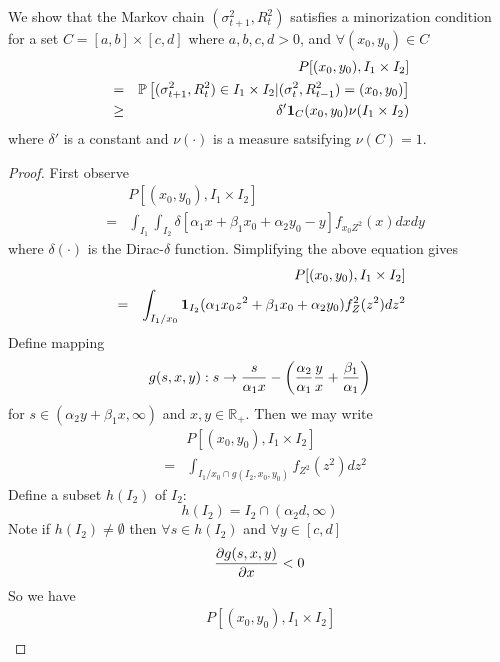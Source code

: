 \documentclass{article}
\theoremstyle{remark}
\begin{document}
We show that the Markov chain $(\sigma_{t+1}^2, R_t^2)$ satisfies a
minorization condition for a set $C = [a, b] \times [c, d]$ where
$a,b,c,d > 0$, and $\forall (x_0, y_0) \in C$
\begin{eqnarray}
  && P[(x_0, y_0), I_1 \times I_2] \nonumber \\
  &=& \mathbb{P} \left[
      (\sigma_{t+1}^2, R_t^2) \in I_1 \times I_2 |
      (\sigma_{t}^2, R_{t-1}^2) = (x_0, y_0)
      \right] \nonumber \\
  &\geq& \delta' \mathbf{1}_{C}(x_0, y_0) \nu(I_1 \times I_2) \label{eq:Minor}
\end{eqnarray}
where $\delta'$ is a constant and $\nu(\cdot)$ is a measure satsifying
$\nu(C) = 1$.
\begin{proof}
  First observe
  \begin{eqnarray*}
    && P[(x_0, y_0), I_1 \times I_2] \\
    &=& \int_{I_1} \int_{I_2}
        \delta \left[
        \alpha_1 x + \beta_1 x_0 + \alpha_2 y_0 - y
        \right]
        f_{x_0 Z^2}(x) dx dy
  \end{eqnarray*}
  where $\delta(\cdot)$ is the Dirac-$\delta$ function.
  Simplifying the above equation gives
  \begin{eqnarray*}
    && P[(x_0, y_0), I_1 \times I_2] \\
    &=& \int_{I_1/x_0} \mathbf{1}_{I_2}(\alpha_1 x_0 z^2 + \beta_1 x_0 +
        \alpha_2 y_0) f_Z^2 (z^2) dz^2
  \end{eqnarray*}
  Define mapping
  \begin{equation*}
    g(s, x, y): s \rightarrow {s \over \alpha_1 x}
    - \left(
      {\alpha_2 \over \alpha_1} {y \over x} + {\beta_1 \over \alpha_1}
    \right)
  \end{equation*}
  for $s \in (\alpha_2 y + \beta_1 x, \infty)$ and $x, y
  \in \mathbb R_+$. Then we may write
  \begin{eqnarray*}
    && P[(x_0, y_0), I_1 \times I_2] \\
    &=& \int_{I_1 / x_0 \cap g(I_2, x_0, y_0)} f_{Z^2}(z^2) dz^2
  \end{eqnarray*}
  Define a subset $h(I_2)$ of $I_2$:
  \[
  h(I_2) = I_2 \cap (\alpha_2 d, \infty)
  \]
  Note if $h(I_2) \neq \emptyset$ then $\forall s \in h(I_2)$ and $\forall
  y \in [c, d]$
  \begin{equation}
    \label{eq:der_g}
    \frac{\partial g(s, x, y)}{\partial x} < 0    
  \end{equation}
  So we have
  \begin{eqnarray*}
    && P[(x_0, y_0), I_1 \times I_2] \\

\end{eqnarray*}
\end{proof}
\end{document}
